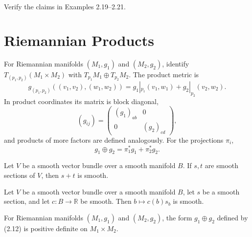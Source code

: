 \begin{exercise}
\label{exer:verify-surface-revolution-examples}
Verify the claims in Examples 2.19--2.21.
\end{exercise}
\section{Riemannian Products}

For Riemannian manifolds $(M_1,g_1)$ and $(M_2,g_2)$, identify
$T_{(p_1,p_2)}(M_1\times M_2)$ with
$T_{p_1}M_1\oplus T_{p_2}M_2$. The product metric is
\begin{equation}
g_{(p_1,p_2)}((v_1,v_2),(w_1,w_2))=g_1|_{p_1}(v_1,w_1)+g_2|_{p_2}(v_2,w_2). \tag{2.12}
\end{equation}
In product coordinates its matrix is block diagonal,
\[
(g_{ij})=\begin{pmatrix}(g_1)_{ab}&0\\0&(g_2)_{cd}\end{pmatrix},
\]
and products of more factors are defined analogously. For the projections $\pi_i$,
\begin{equation}
g_1\oplus g_2=\pi_1^*g_1+\pi_2^*g_2. \tag{2.12'}
\end{equation}

\begin{lemma}
\label{lem:smooth-tensor-field-add}
\mathlibok
Let $V$ be a smooth vector bundle over a smooth manifold $B$. If $s,t$ are smooth sections of $V$, then $s+t$ is smooth.
\end{lemma}

\begin{lemma}
\label{lem:smooth-tensor-field-smul}
\mathlibok
Let $V$ be a smooth vector bundle over a smooth manifold $B$, let $s$ be a smooth section, and let $c:B\to\mathbb R$ be smooth. Then $b\mapsto c(b)s_b$ is smooth.
\end{lemma}

\begin{lemma}
\label{lem:product-form-positive-definite}
\leanok
{}
For Riemannian manifolds $(M_1,g_1)$ and $(M_2,g_2)$, the form $g_1\oplus g_2$ defined by (2.12) is positive definite on $M_1\times M_2$.
\end{lemma}

